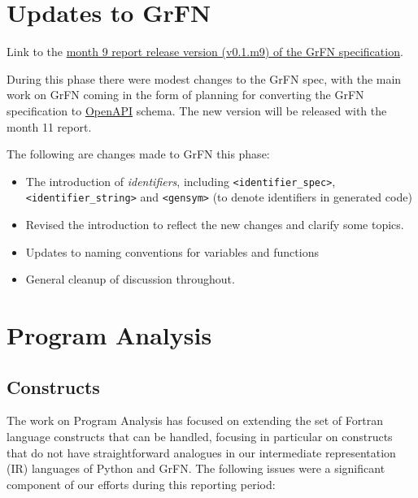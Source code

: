 \documentclass[article, 12pt, oneside]{memoir}
\begin{document}
\hypertarget{updates-to-grfn}{%
\section{Updates to GrFN}\label{updates-to-grfn}}

Link to the \href{GrFN_specification_v0.1.m9.md}{month 9 report release
version (v0.1.m9) of the GrFN specification}.

During this phase there were modest changes to the GrFN spec, with the
main work on GrFN coming in the form of planning for converting the GrFN
specification to
\href{https://swagger.io/docs/specification/about/}{OpenAPI} schema. The
new version will be released with the month 11 report.

The following are changes made to GrFN this phase:

\begin{itemize}
\tightlist
\item
  The introduction of \emph{identifiers}, including
  \texttt{\textless{}identifier\_spec\textgreater{}},
  \texttt{\textless{}identifier\_string\textgreater{}} and
  \texttt{\textless{}gensym\textgreater{}} (to denote identifiers in
  generated code)
\item
  Revised the introduction to reflect the new changes and clarify some
  topics.
\item
  Updates to naming conventions for variables and functions
\item
  General cleanup of discussion throughout.
\end{itemize}

\hypertarget{program-analysis}{%
\section{Program Analysis}\label{program-analysis}}

\hypertarget{constructs}{%
\subsection{Constructs}\label{constructs}}

The work on Program Analysis has focused on extending the set of Fortran
language constructs that can be handled, focusing in particular on
constructs that do not have straightforward analogues in our
intermediate representation (IR) languages of Python and GrFN. The
following issues were a significant component of our efforts during this
reporting period:
\end{document}
